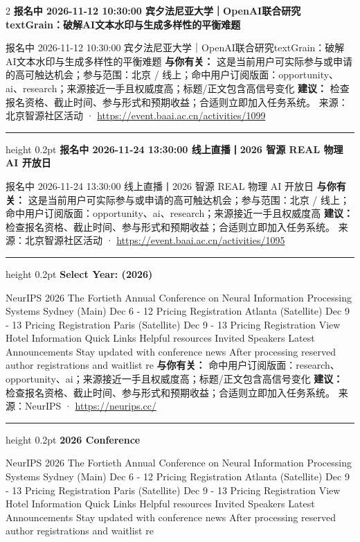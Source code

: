 \documentclass[10.5pt]{ctexart}
\begin{document}
\begin{multicols}{2}
{\large\bfseries 报名中 2026-11-12 10:30:00 宾夕法尼亚大学｜OpenAI联合研究textGrain：破解AI文本水印与生成多样性的平衡难题}\par
报名中 2026-11-12 10:30:00 宾夕法尼亚大学｜OpenAI联合研究textGrain：破解AI文本水印与生成多样性的平衡难题
\textbf{与你有关：} 这是当前用户可实际参与或申请的高可触达机会；参与范围：北京 / 线上；命中用户订阅版面：opportunity、ai、research；来源接近一手且权威度高；标题/正文包含高信号变化
\textbf{建议：} 检查报名资格、截止时间、参与形式和预期收益；合适则立即加入任务系统。
{\footnotesize\color{ormuted} 来源：北京智源社区活动 · \url{https://event.baai.ac.cn/activities/1099}}
\vspace{2mm}
\hrule height 0.2pt
\vspace{2mm}
{\large\bfseries 报名中 2026-11-24 13:30:00 线上直播丨2026 智源 REAL 物理 AI 开放日}\par
报名中 2026-11-24 13:30:00 线上直播丨2026 智源 REAL 物理 AI 开放日
\textbf{与你有关：} 这是当前用户可实际参与或申请的高可触达机会；参与范围：北京 / 线上；命中用户订阅版面：opportunity、ai、research；来源接近一手且权威度高
\textbf{建议：} 检查报名资格、截止时间、参与形式和预期收益；合适则立即加入任务系统。
{\footnotesize\color{ormuted} 来源：北京智源社区活动 · \url{https://event.baai.ac.cn/activities/1095}}
\vspace{2mm}
\hrule height 0.2pt
\vspace{2mm}
{\large\bfseries Select Year: (2026)}\par
NeurIPS 2026 The Fortieth Annual Conference on Neural Information Processing Systems Sydney (Main) Dec 6 - 12 Pricing Registration Atlanta (Satellite) Dec 9 - 13 Pricing Registration Paris (Satellite) Dec 9 - 13 Pricing Registration View Hotel Information Quick Links Helpful resources Invited Speakers Latest Announcements Stay updated with conference news After processing reserved author registrations and waitlist re
\textbf{与你有关：} 命中用户订阅版面：research、opportunity、ai；来源接近一手且权威度高；标题/正文包含高信号变化
\textbf{建议：} 检查报名资格、截止时间、参与形式和预期收益；合适则立即加入任务系统。
{\footnotesize\color{ormuted} 来源：NeurIPS · \url{https://neurips.cc/}}
\vspace{2mm}
\hrule height 0.2pt
\vspace{2mm}
{\large\bfseries 2026 Conference}\par
NeurIPS 2026 The Fortieth Annual Conference on Neural Information Processing Systems Sydney (Main) Dec 6 - 12 Pricing Registration Atlanta (Satellite) Dec 9 - 13 Pricing Registration Paris (Satellite) Dec 9 - 13 Pricing Registration View Hotel Information Quick Links Helpful resources Invited Speakers Latest Announcements Stay updated with conference news After processing reserved author registrations and waitlist re

\end{multicols}
\end{document}

